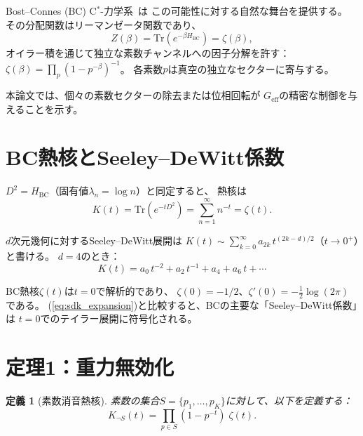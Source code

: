 \documentclass[a4paper,11pt]{article}
\newtheorem{definition}[theorem]{定義}
\newcommand{\Tr}{\mathrm{Tr}}
\begin{document}
Bost--Connes (BC) C$^*$-力学系~\cite{BostConnes1995}は
この可能性に対する自然な舞台を提供する。
その分配関数はリーマンゼータ関数であり、
\begin{equation}
  Z(\beta) = \Tr(e^{-\beta H_{\mathrm{BC}}}) = \zeta(\beta),
  \label{eq:bc}
\end{equation}
オイラー積を通じて独立な素数チャンネルへの因子分解を許す：
$\zeta(\beta) = \prod_p (1 - p^{-\beta})^{-1}$。
各素数$p$は真空の独立なセクターに寄与する。

本論文では、個々の素数セクターの除去または位相回転が
$G_{\mathrm{eff}}$の精密な制御を与えることを示す。

\section{BC熱核とSeeley--DeWitt係数}
\label{sec:sdk}

$D^2 = H_{\mathrm{BC}}$（固有値$\lambda_n = \log n$）と同定すると、
熱核は
\begin{equation}
  K(t) = \Tr(e^{-t D^2}) = \sum_{n=1}^\infty n^{-t} = \zeta(t).
\end{equation}

$d$次元幾何に対するSeeley--DeWitt展開は
$K(t) \sim \sum_{k=0}^\infty a_{2k}\, t^{(2k-d)/2}$（$t \to 0^+$）と書ける。
$d = 4$のとき：
\begin{equation}
  K(t) = a_0\, t^{-2} + a_2\, t^{-1} + a_4 + a_6\, t + \cdots
  \label{eq:sdk_expansion}
\end{equation}

BC熱核$\zeta(t)$は$t = 0$で解析的であり、
$\zeta(0) = -1/2$、$\zeta'(0) = -\tfrac{1}{2}\log(2\pi)$である。
(\ref{eq:sdk_expansion})と比較すると、BCの主要な「Seeley--DeWitt係数」は
$t = 0$でのテイラー展開に符号化される。

\section{定理1：重力無効化}
\label{sec:nullification}

\begin{definition}[素数消音熱核]
素数の集合$S = \{p_1, \ldots, p_K\}$に対して、以下を定義する：
\begin{equation}
  K_{\neg S}(t) = \prod_{p \in S}(1 - p^{-t})\;\zeta(t).
\end{equation}
\end{definition}
\end{document}
